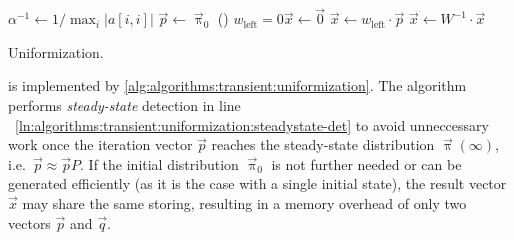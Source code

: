 \begin{algorithm}
  \;
  $\alpha^{-1} \gets 1 / \max_{i} \lvert a[i,i] \rvert$
  \label{ln:algorithms:transient:uniformization:alpha}\;
  $\vec{p} \gets \vec{\uppi}_0$\;
  \leIf()
  {$w_{\text{left}} = 0$}{$\vec{x} \gets \vec{0}$}
  {$\vec{x} \gets w_{\text{left}} \cdot \vec{p}$}
  $\vec{x} \gets W^{-1} \cdot \vec{x}$
  \;
  \caption{Uniformization.}
  \label{alg:algorithms:transient:uniformization}
\end{algorithm}

 is implemented by
\vref{alg:algorithms:transient:uniformization}. The algorithm performs
\emph{steady-state} detection in line%
~\ref{ln:algorithms:transient:uniformization:steadystate-det} to avoid
unneccessary work once the iteration vector $\vec{p}$ reaches the
steady-state distribution $\vec{\uppi}(\infty)$,
i.e.~$\vec{p} \approx \vec{p} P$. If the initial distribution
$\vec{\uppi}_0$ is not further needed or can be generated efficiently
(as it is the case with a single initial state), the result vector
$\vec{x}$ may share the same storing, resulting in a memory overhead
of only two vectors $\vec{p}$ and $\vec{q}$.


